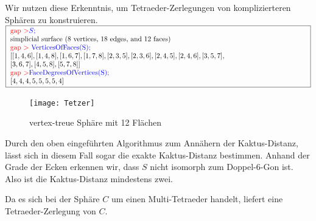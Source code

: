 \documentclass[12pt,titlepage,twoside,cleardoublepage]{article}
\theoremstyle{nummermitklammern}
\newtheorem{bsp}[temp]{Beispiel}
\newtheorem{bsp}[zahl]{Beispiel}
\numberwithin{equation}{section}
\begin{document}
Wir nutzen diese Erkenntnis, um Tetraeder-Zerlegungen von komplizierteren Sphären zu konstruieren.\newline
$\fbox{
\parbox{15cm}{
\textcolor{red}{gap $>$}\textcolor{blue}{$S;$}\\
simplicial surface (8 vertices, 18 edges, and 12 faces)\\
\textcolor{red}{gap $>$} \textcolor{blue}{VerticesOfFaces(S);}\\
$[ [ 1, 4, 6 ], [ 1, 4, 8 ], [ 1, 6, 7 ], [ 1, 7, 8 ], [ 2, 3, 5 ],
[ 2, 3, 6 ], [ 2, 4, 5 ], [ 2, 4, 6 ], [ 3, 5, 7 ],$\newline
$ [ 3, 6, 7 ],
[ 4, 5, 8 ], [ 5, 7, 8 ] ]$\newline
\textcolor{red}{gap $>$}\textcolor{blue}{ FaceDegreesOfVertices(S);}\\
$[ 4, 4, 4, 5, 5, 5, 5, 4 ]$
 }}$\\
 \begin{figure}[H]
\begin{center}
\texttt{[image: Tetzer]}
\end{center}
\caption{vertex-treue Sphäre mit 12 Flächen}
\end{figure}
Durch den oben eingeführten Algorithmus zum Annähern der Kaktus-Distanz, lässt sich in diesem Fall sogar die exakte Kaktus-Distanz bestimmen. Anhand der Grade der Ecken erkennen wir, dass $S$ nicht isomorph zum Doppel-6-Gon ist. Also ist die Kaktus-Distanz mindestens zwei.
\begin{center}
 \end{center}
Da es sich bei der Sphäre $C$ um einen Multi-Tetraeder handelt, liefert  eine Tetraeder-Zerlegung von $C.$
\end{document}
